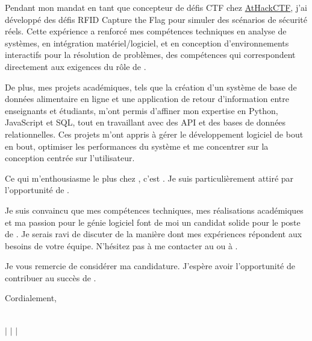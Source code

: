 \documentclass[10pt]{article}
\begin{document}
Pendant mon mandat en tant que concepteur de défis CTF chez \href{https://www.athackctf.com}{AtHackCTF}, j'ai développé des défis RFID Capture the Flag pour simuler des scénarios de sécurité réels. Cette expérience a renforcé mes compétences techniques en analyse de systèmes, en intégration matériel/logiciel, et en conception d'environnements interactifs pour la résolution de problèmes, des compétences qui correspondent directement aux exigences du rôle de \position.

De plus, mes projets académiques, tels que la création d'un système de base de données alimentaire en ligne et une application de retour d'information entre enseignants et étudiants, m'ont permis d'affiner mon expertise en Python, JavaScript et SQL, tout en travaillant avec des API et des bases de données relationnelles. Ces projets m'ont appris à gérer le développement logiciel de bout en bout, optimiser les performances du système et me concentrer sur la conception centrée sur l'utilisateur.

Ce qui m'enthousiasme le plus chez \company, c'est \companyDetails. Je suis particulièrement attiré par l'opportunité de \positionDetails.

Je suis convaincu que mes compétences techniques, mes réalisations académiques et ma passion pour le génie logiciel font de moi un candidat solide pour le poste de \position. Je serais ravi de discuter de la manière dont mes expériences répondent aux besoins de votre équipe. N'hésitez pas à me contacter au \href{tel:+15149445977}{\phone} ou à \href{mailto:\email}{\email}.

\vspace{1.5em}
Je vous remercie de considérer ma candidature. J'espère avoir l'opportunité de contribuer au succès de \company.

\vspace{2em}
Cordialement, \\
\fullname

\newpage

\begin{center}
    {\Huge \textbf{\fullname}} \\
    \vspace{1mm}
    {\small 
    \faPhone \hspace{0mm} \href{tel:+15149445977}{\phone} $\vert$ 
    \faEnvelope \hspace{0mm} \href{mailto:massimo02caruso@gmail.com}{\email} $\vert$ 
    \faLinkedin \hspace{0mm} \href{https://linkedin.com/in/massimocaruso}{\linkedin} $\vert$ 
    \faGithub \hspace{0mm} \href{https://github.com/Extinctable}{\github}
    }
\end{center}
\end{document}
